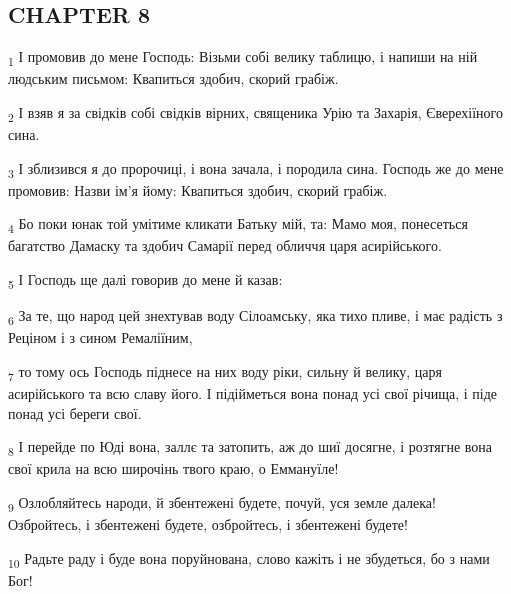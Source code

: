 \subsection{CHAPTER 8}
\begin{tcolorbox}
\textsubscript{1} І промовив до мене Господь: Візьми собі велику таблицю, і напиши на ній людським письмом: Квапиться здобич, скорий грабіж.
\end{tcolorbox}
\begin{tcolorbox}
\textsubscript{2} І взяв я за свідків собі свідків вірних, священика Урію та Захарія, Єверехіїного сина.
\end{tcolorbox}
\begin{tcolorbox}
\textsubscript{3} І зблизився я до пророчиці, і вона зачала, і породила сина. Господь же до мене промовив: Назви ім'я йому: Квапиться здобич, скорий грабіж.
\end{tcolorbox}
\begin{tcolorbox}
\textsubscript{4} Бо поки юнак той умітиме кликати Батьку мій, та: Мамо моя, понесеться багатство Дамаску та здобич Самарії перед обличчя царя асирійського.
\end{tcolorbox}
\begin{tcolorbox}
\textsubscript{5} І Господь ще далі говорив до мене й казав:
\end{tcolorbox}
\begin{tcolorbox}
\textsubscript{6} За те, що народ цей знехтував воду Сілоамську, яка тихо пливе, і має радість з Реціном і з сином Ремаліїним,
\end{tcolorbox}
\begin{tcolorbox}
\textsubscript{7} то тому ось Господь піднесе на них воду ріки, сильну й велику, царя асирійського та всю славу його. І підійметься вона понад усі свої річища, і піде понад усі береги свої.
\end{tcolorbox}
\begin{tcolorbox}
\textsubscript{8} І перейде по Юді вона, заллє та затопить, аж до шиї досягне, і розтягне вона свої крила на всю широчінь твого краю, о Еммануїле!
\end{tcolorbox}
\begin{tcolorbox}
\textsubscript{9} Озлобляйтесь народи, й збентежені будете, почуй, уся земле далека! Озбройтесь, і збентежені будете, озбройтесь, і збентежені будете!
\end{tcolorbox}
\begin{tcolorbox}
\textsubscript{10} Радьте раду і буде вона поруйнована, слово кажіть і не збудеться, бо з нами Бог!
\end{tcolorbox}
